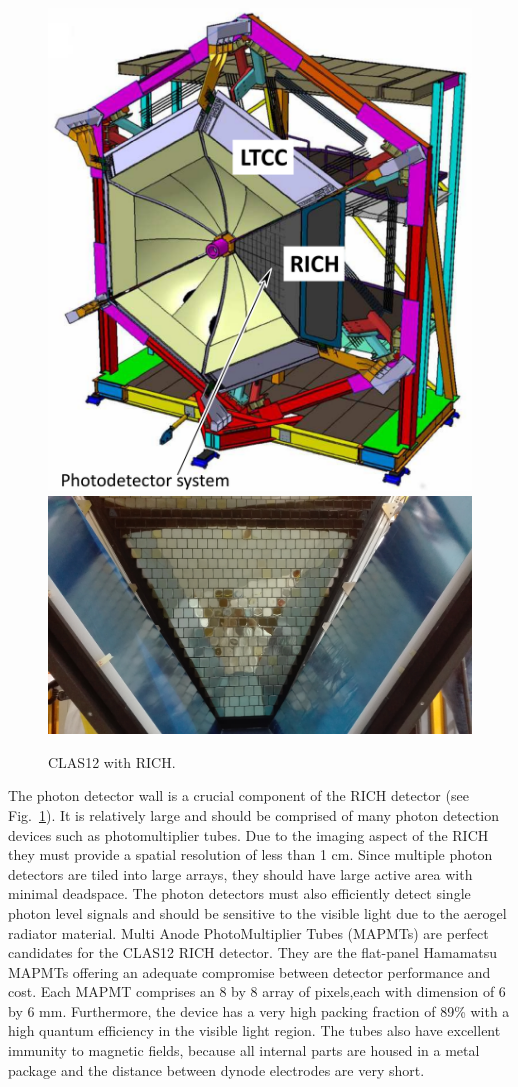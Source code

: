 \documentclass[5p,times,preprint]{elsarticle}
\begin{document}
\begin{figure}[hbt]
	\centering
	\includegraphics[width=0.7\linewidth]{RICHdetector.pdf}
	\includegraphics[width=0.7\linewidth]{RICHpanel_front.png}
	\caption{CLAS12 with RICH.}
	\label{fig:RICHdetector}
\end{figure}

The photon detector wall is a crucial component of the RICH detector (see Fig.~\ref{fig:RICHdetector}). It is relatively large and should be comprised of many photon detection devices such as photomultiplier tubes.
Due to the imaging aspect of the RICH they must provide a spatial resolution of less than 1 cm.
Since multiple photon detectors are tiled into large arrays, they should have large active area with minimal deadspace.
The photon detectors must also efficiently detect single photon level signals and should be sensitive to the visible light due to the aerogel radiator material.
Multi Anode PhotoMultiplier Tubes (MAPMTs) are perfect candidates for the CLAS12 RICH detector.
They are the flat-panel Hamamatsu MAPMTs offering an adequate compromise between detector performance and cost.
Each MAPMT comprises an 8 by 8 array of pixels,each with dimension of 6 by 6 mm.
Furthermore, the device has a very high packing fraction of 89\% with a high quantum efficiency in the visible light region.
The tubes also have excellent immunity to magnetic fields, because all internal parts are housed in a metal package and the distance between dynode electrodes are very short.
\end{document}
